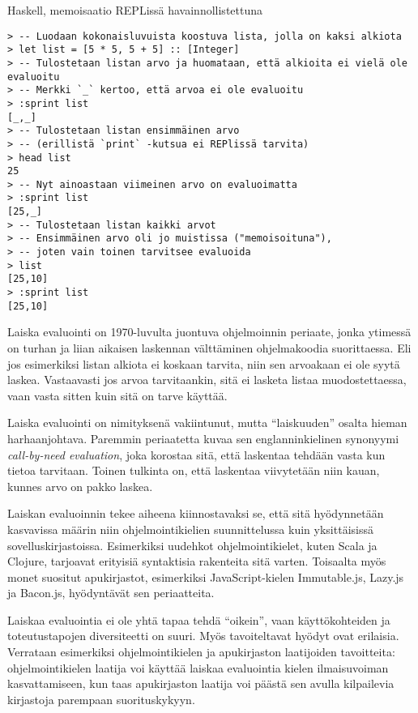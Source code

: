\begin{listing}[H]
  \caption{Haskell, memoisaatio REPLissä havainnollistettuna}
  \bigskip
  \begin{verbatim}
> -- Luodaan kokonaisluvuista koostuva lista, jolla on kaksi alkiota
> let list = [5 * 5, 5 + 5] :: [Integer]
> -- Tulostetaan listan arvo ja huomataan, että alkioita ei vielä ole evaluoitu
> -- Merkki `_` kertoo, että arvoa ei ole evaluoitu
> :sprint list
[_,_]
> -- Tulostetaan listan ensimmäinen arvo
> -- (erillistä `print` -kutsua ei REPlissä tarvita)
> head list
25
> -- Nyt ainoastaan viimeinen arvo on evaluoimatta
> :sprint list
[25,_]
> -- Tulostetaan listan kaikki arvot
> -- Ensimmäinen arvo oli jo muistissa ("memoisoituna"),
> -- joten vain toinen tarvitsee evaluoida
> list
[25,10]
> :sprint list
[25,10]
\end{verbatim}
\end{listing}
Laiska evaluointi on 1970-luvulta juontuva ohjelmoinnin periaate, jonka ytimessä on turhan ja liian aikaisen laskennan välttäminen ohjelmakoodia suorittaessa. Eli jos esimerkiksi listan alkiota ei koskaan tarvita, niin sen arvoakaan ei ole syytä laskea. Vastaavasti jos arvoa tarvitaankin, sitä ei lasketa listaa muodostettaessa, vaan vasta sitten kuin sitä on tarve käyttää.

Laiska evaluointi on nimityksenä vakiintunut, mutta ``laiskuuden'' osalta hieman harhaanjohtava. Paremmin periaatetta kuvaa sen englanninkielinen synonyymi \textit{call-by-need evaluation}, joka korostaa sitä, että laskentaa tehdään vasta kun tietoa tarvitaan. Toinen tulkinta on, että laskentaa viivytetään niin kauan, kunnes arvo on pakko laskea.

Laiskan evaluoinnin tekee aiheena kiinnostavaksi se, että sitä hyödynnetään kasvavissa määrin niin ohjelmointikielien suunnittelussa kuin yksittäisissä sovelluskirjastoissa. Esimerkiksi uudehkot ohjelmointikielet, kuten Scala ja Clojure, tarjoavat erityisiä syntaktisia rakenteita sitä varten. Toisaalta myös monet suositut apukirjastot, esimerkiksi JavaScript-kielen Immutable.js, Lazy.js ja Bacon.js, hyödyntävät sen periaatteita.

Laiskaa evaluointia ei ole yhtä tapaa tehdä ``oikein'', vaan käyttökohteiden ja toteutustapojen diversiteetti on suuri. Myös tavoiteltavat hyödyt ovat erilaisia. Verrataan esimerkiksi ohjelmointikielen ja apukirjaston laatijoiden tavoitteita: ohjelmointikielen laatija voi käyttää laiskaa evaluointia kielen ilmaisuvoiman kasvattamiseen, kun taas apukirjaston laatija voi päästä sen avulla kilpailevia kirjastoja parempaan suorituskykyyn.

